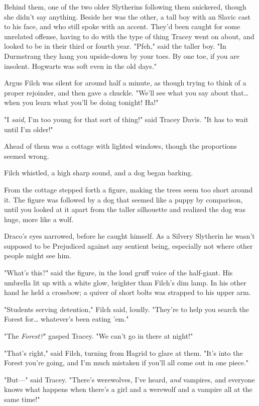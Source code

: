 Behind them, one of the two older Slytherins following them snickered, though she didn't say anything. Beside her was the other, a tall boy with an Slavic cast to his face, and who still spoke with an accent. They'd been caught for some unrelated offense, having to do with the type of thing Tracey went on about, and looked to be in their third or fourth year. "Pfeh," said the taller boy. "In Durmstrang they hang you upside-down by your toes. By one toe, if you are insolent. Hogwarts was soft even in the old days."

Argus Filch was silent for around half a minute, as though trying to think of a proper rejoinder, and then gave a chuckle. "We'll see what you say about that{\ldots} when you learn what you'll be doing tonight! Ha!"

"I \emph{said,} I'm too young for that sort of thing!" said Tracey Davis. "It has to wait until I'm older!"

Ahead of them was a cottage with lighted windows, though the proportions seemed wrong.

Filch whistled, a high sharp sound, and a dog began barking.

From the cottage stepped forth a figure, making the trees seem too short around it. The figure was followed by a dog that seemed like a puppy by comparison, until you looked at it apart from the taller silhouette and realized the dog was huge, more like a wolf.

Draco's eyes narrowed, before he caught himself. As a Silvery Slytherin he wasn't supposed to be Prejudiced against any sentient being, especially not where other people might see him.

"What's this?" said the figure, in the loud gruff voice of the half-giant. His umbrella lit up with a white glow, brighter than Filch's dim lamp. In his other hand he held a crossbow; a quiver of short bolts was strapped to his upper arm.

"Students serving detention," Filch said, loudly. "They're to help you search the Forest for… whatever's been eating 'em."

"The \emph{Forest?}" gasped Tracey. "We can't go in there at night!"

"That's right," said Filch, turning from Hagrid to glare at them. "It's into the Forest you're going, and I'm much mistaken if you'll all come out in one piece."

"But---" said Tracey. "There's werewolves, I've heard, \emph{and} vampires, and everyone knows what happens when there's a girl and a werewolf and a vampire all at the same time!"


